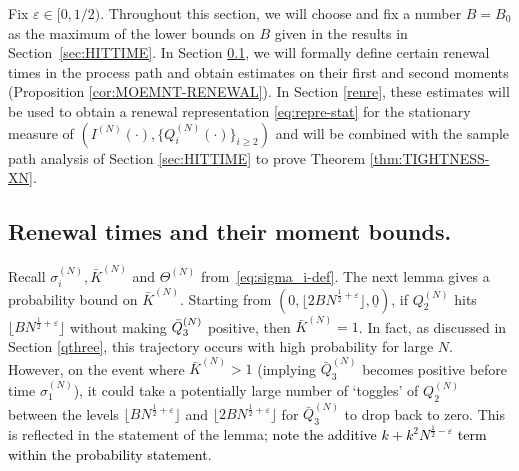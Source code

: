 \documentclass[11pt, reqno]{article}
\numberwithin{equation}{section}
\numberwithin{theorem}{section}
\begin{document}
Fix $\varepsilon \in [0, 1/2)$. Throughout this section, we will choose and fix a number $B=B_0$ as the maximum of the lower bounds on $B$ given in the results in Section~\ref{sec:HITTIME}. In Section \ref{renbd}, we will formally define certain renewal times in the process path and obtain estimates on their first and second moments (Proposition \ref{cor:MOEMNT-RENEWAL}). In Section \ref{renre}, these estimates will be used to obtain a renewal representation \eqref{eq:repre-stat} for the stationary measure of $(I^{(N)}(\cdot), \{Q^{(N)}_i(\cdot)\}_{i \ge 2})$ and will be combined with the sample path analysis of Section \ref{sec:HITTIME} to prove Theorem \ref{thm:TIGHTNESS-XN}. 

\subsection{Renewal times and their moment bounds.}\label{renbd}
Recall $\sigma^{(N)}_i, \bar{K}^{(N)}$ and $\Theta^{(N)}$ from~\eqref{eq:sigma_i-def}.
The next lemma gives a probability bound on $\bar{K}^{(N)}$. 
Starting from $(0, \lfloor 2B N^{\frac{1}{2} + \varepsilon}\rfloor, \underline{0})$, if $Q^{(N)}_2$ hits $\lfloor BN^{\frac{1}{2}+\varepsilon}\rfloor$ without making $\Bar{Q}^{(N)}_3$ positive, then $\bar{K}^{(N)}=1$.
In fact, as discussed in Section \ref{qthree}, this trajectory occurs with high probability for large $N$.
However, on the event where $\bar{K}^{(N)} >1$ (implying $\bar{Q}^{(N)}_3$ becomes positive before time $\sigma^{(N)}_1$), it could take a potentially large number of `toggles' of $Q^{(N)}_2$ between the levels  $\lfloor BN^{\frac{1}{2}+\varepsilon}\rfloor$ and $\lfloor 2BN^{\frac{1}{2}+\varepsilon} \rfloor$ for $\bar{Q}^{(N)}_3$ to drop back to zero. This is reflected in the statement of the lemma; \textcolor{black}{note the additive $k+k^2N^{\frac{1}{2}-\varepsilon}$ term within the probability statement}.
\end{document}
